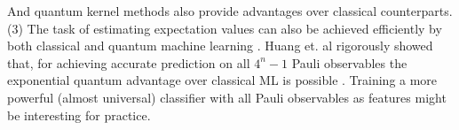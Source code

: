 \documentclass[
aps,
pra,
twocolumn,
floatfix,
]{revtex4-2}
\theoremstyle{plain}
\theoremstyle{definition}
\newcommand{\ob}{O}
\newcommand{\pob}{O}
\newcommand{\dm}{\rho}
\begin{document}
And quantum kernel methods \cite{schuldQuantumMachineLearning2019,schuldSupervisedQuantumMachine2021,liuRigorousRobustQuantum2021} also provide advantages over classical counterparts.
(3) 
The task of estimating expectation values can also be achieved efficiently by both classical \cite{gaoEfficientRepresentationQuantum2017,torlaiManybodyQuantumState2018,zhuFlexibleLearningQuantum2022} and quantum machine learning \cite{huangPowerDataQuantum2021,huangProvablyEfficientMachine2022}.
Huang et. al rigorously showed that, 
for achieving accurate prediction on all $4^n-1$ Pauli observables 
the exponential quantum advantage over classical ML is possible
\cite{huangInformationtheoreticBoundsQuantum2021}.
Training a more powerful (almost universal) classifier with all Pauli observables as features might be interesting for practice.
\end{document}
